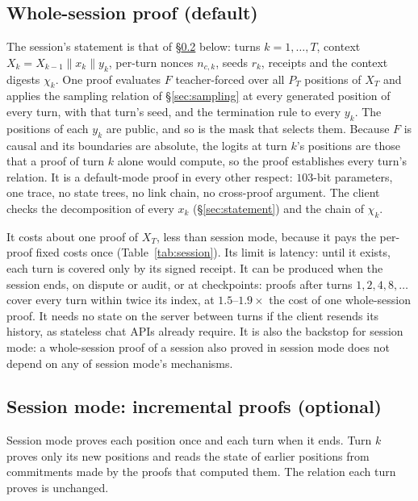 \documentclass[11pt]{article}
\begin{document}
\subsection{Whole-session proof (default)}
\label{sec:whole}

The session's statement is that of \S\ref{sec:incr} below: turns \(k = 1, \ldots, T\), context \(X_k = X_{k-1} \| x_k \| y_k\), per-turn nonces \(n_{c,k}\), seeds \(r_k\), receipts and the context digests \(\chi_k\).
One proof evaluates \(F\) teacher-forced over all \(P_T\) positions of \(X_T\) and applies the sampling relation of \S\ref{sec:sampling} at every generated position of every turn, with that turn's seed, and the termination rule to every \(y_k\).
The positions of each \(y_k\) are public, and so is the mask that selects them.
Because \(F\) is causal and its boundaries are absolute, the logits at turn \(k\)'s positions are those that a proof of turn \(k\) alone would compute, so the proof establishes every turn's relation.
It is a default-mode proof in every other respect: \(103\)-bit parameters, one trace, no state trees, no link chain, no cross-proof argument.
The client checks the decomposition of every \(x_k\) (\S\ref{sec:statement}) and the chain of \(\chi_k\).

It costs about one proof of \(X_T\), less than session mode, because it pays the per-proof fixed costs once (Table~\ref{tab:session}).
Its limit is latency: until it exists, each turn is covered only by its signed receipt.
It can be produced when the session ends, on dispute or audit, or at checkpoints: proofs after turns \(1, 2, 4, 8, \ldots\) cover every turn within twice its index, at \(1.5\)--\(1.9\times\) the cost of one whole-session proof.
It needs no state on the server between turns if the client resends its history, as stateless chat APIs already require.
It is also the backstop for session mode: a whole-session proof of a session also proved in session mode does not depend on any of session mode's mechanisms.

\subsection{Session mode: incremental proofs (optional)}
\label{sec:incr}

Session mode proves each position once and each turn when it ends.
Turn \(k\) proves only its new positions and reads the state of earlier positions from commitments made by the proofs that computed them.
The relation each turn proves is unchanged.
\end{document}

